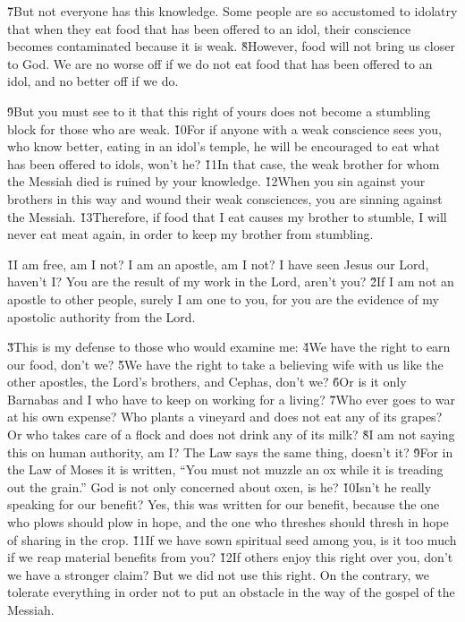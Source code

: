 \v{7}But not everyone has this knowledge. Some people are so accustomed to idolatry that when they eat food that has been offered to an idol, their conscience becomes contaminated because it is weak. \v{8}However, food will not bring us closer to God. We are no worse off if we do not eat food that has been offered to an idol, and no better off if we do.

\v{9}But you must see to it that this right of yours does not become a stumbling block for those who are weak. \v{10}For if anyone with a weak conscience sees you, who know better, eating in an idol's temple, he will be encouraged to eat what has been offered to idols, won't he? \v{11}In that case, the weak brother for whom the Messiah died is ruined by your knowledge. \v{12}When you sin against your brothers in this way and wound their weak consciences, you are sinning against the Messiah. \v{13}Therefore, if food that I eat causes my brother to stumble, I will never eat meat again, in order to keep my brother from stumbling.

\v{1}I am free, am I not? I am an apostle, am I not? I have seen Jesus our Lord, haven't I? You are the result of my work in the Lord, aren't you? \v{2}If I am not an apostle to other people, surely I am one to you, for you are the evidence of my apostolic authority from the Lord.

\v{3}This is my defense to those who would examine me: \v{4}We have the right to earn our food, don't we? \v{5}We have the right to take a believing wife with us like the other apostles, the Lord's brothers, and Cephas, don't we? \v{6}Or is it only Barnabas and I who have to keep on working for a living? \v{7}Who ever goes to war at his own expense? Who plants a vineyard and does not eat any of its grapes? Or who takes care of a flock and does not drink any of its milk? \v{8}I am not saying this on human authority, am I? The Law says the same thing, doesn't it? \v{9}For in the Law of Moses it is written, ``You must not muzzle an ox while it is treading out the grain.'' God is not only concerned about oxen, is he? \v{10}Isn't he really speaking for our benefit? Yes, this was written for our benefit, because the one who plows should plow in hope, and the one who threshes should thresh in hope of sharing in the crop. \v{11}If we have sown spiritual seed among you, is it too much if we reap material benefits from you? \v{12}If others enjoy this right over you, don't we have a stronger claim? But we did not use this right. On the contrary, we tolerate everything in order not to put an obstacle in the way of the gospel of the Messiah.

